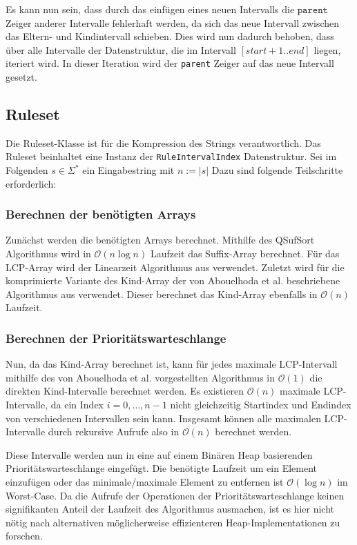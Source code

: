 Es kann nun sein, dass durch das einfügen eines neuen Intervalls die $\texttt{parent}$ Zeiger anderer Intervalle fehlerhaft werden, da sich das neue Intervall zwischen das Eltern- und
Kindintervall schieben. Dies wird nun dadurch behoben, dass über alle Intervalle der Datenstruktur, die im Intervall $[start+1..end]$ liegen, iteriert wird. In dieser Iteration wird der \texttt{parent} Zeiger auf das neue Intervall gesetzt. 


\subsection{Ruleset}

Die Ruleset-Klasse ist für die Kompression des Strings verantwortlich. Das Ruleset beinhaltet eine Instanz der \texttt{RuleIntervalIndex} Datenstruktur. Sei im Folgenden $s \in \Sigma^*$ ein Eingabestring mit $n := |s|$ Dazu sind folgende Teilschritte erforderlich:

\subsubsection{Berechnen der benötigten Arrays}

Zunächst werden die benötigten Arrays berechnet. Mithilfe des QSufSort Algorithmus \cite{larsson_faster_2007} wird in $\mathcal{O}(n \log n)$ Laufzeit das Suffix-Array berechnet. Für das LCP-Array wird der Linearzeit Algorithmus aus \cite{kasai_linear-time_2001} verwendet. Zuletzt wird für die komprimierte Variante des Kind-Array der von Abouelhoda et al. beschriebene Algorithmus aus \cite{abouelhoda_optimal_2002} verwendet. Dieser berechnet das Kind-Array ebenfalls in $\mathcal{O}(n)$ Laufzeit.

\subsubsection{Berechnen der Prioritätswarteschlange}

Nun, da das Kind-Array berechnet ist, kann für jedes maximale LCP-Intervall mithilfe des von Abouelhoda et al. vorgestellten Algorithmus in $\mathcal{O}(1)$ die direkten Kind-Intervalle berechnet werden. Es existieren $\mathcal{O}(n)$ maximale LCP-Intervalle, da ein Index $i = 0,\dots,n - 1$ nicht gleichzeitig Startindex und Endindex von verschiedenen Intervallen sein kann. Insgesamt können alle maximalen LCP-Intervalle durch rekursive Aufrufe also in $\mathcal{O}(n)$ berechnet werden.

Diese Intervalle werden nun in eine auf einem Binären Heap \cite{williams_algorithm_1964} basierenden Prioritätswarteschlange eingefügt. Die benötigte Laufzeit um ein Element einzufügen oder das minimale/maximale Element zu entfernen ist $\mathcal{O}(\log n)$ im Worst-Case. Da die Aufrufe der Operationen der Prioritätswarteschlange keinen signifikanten Anteil der Laufzeit des Algorithmus ausmachen, ist es hier nicht nötig nach alternativen möglicherweise effizienteren Heap-Implementationen zu forschen.

